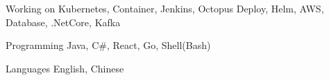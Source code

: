 

\begin{cvskills}

  \cvskill
    {Working on} %
    {Kubernetes, Container, Jenkins, Octopus Deploy, Helm, AWS, Database, .NetCore, Kafka} %

  \cvskill
    {Programming} %
    {Java, C\#, React, Go, Shell(Bash)} %

  \cvskill
    {Languages} %
    {English, Chinese} %

\end{cvskills}
